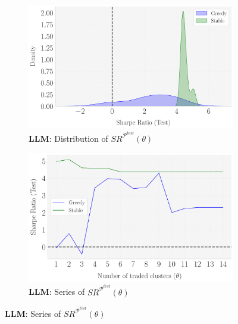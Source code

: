 \begin{figure}[H]
  \bx 
      \begin{subfigure}[b]{0.46\textwidth}
    \centering
    \includegraphics[width=\textwidth]{fig_9c_LLAMA_RobustnessCheck_SR_Test_Set_Distribution_[Change_theta].pdf}
    \caption{\textbf{LLM}: Distribution of $SR^{\mathcal P^{test}}(\theta)$}
    \label{fig:LLM_Robustness_theta_Distr}
  \end{subfigure}
  \hspace{0.05\textwidth} %
  \begin{subfigure}[b]{0.46\textwidth}
    \centering
    \includegraphics[width=\textwidth]{fig_9d_LLAMA_RobustnessCheck_SR_Test_Set_vs_theta_[Change_theta].pdf}
    \caption{\textbf{LLM}: Series of $SR^{\mathcal P^{test}}(\theta)$}
    \label{fig:LLM_Robustness_theta_Series}
  \end{subfigure}


\end{figure}
